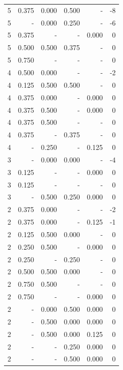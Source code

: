 \documentclass[a4paper]{article}\usepackage[]{graphicx}\usepackage[]{color}
\begin{document}
\begin{table}[ht]
\begin{tabular}{rrrrrr}
   \rowcolor{badColor} 5 & 0.375 & 0.000 & 0.500 & - & -8 \\ 
   \rowcolor{badColor} 5 & - & 0.000 & 0.250 & - & -6 \\ 
   \rowcolor{nullColor} 5 & 0.375 & - & - & 0.000 & 0 \\ 
  5 & 0.500 & 0.500 & 0.375 & - & 0 \\ 
   \rowcolor{nullColor} 5 & 0.750 & - & - & - & 0 \\ 
  4 & 0.500 & 0.000 & - & - & -2 \\ 
   \rowcolor{goodColor} 4 & 0.125 & 0.500 & 0.500 & - & 0 \\ 
  4 & 0.375 & 0.000 & - & 0.000 & 0 \\ 
  4 & 0.375 & 0.500 & - & 0.000 & 0 \\ 
  4 & 0.375 & 0.500 & - & - & 0 \\ 
   \rowcolor{sosoColor} 4 & 0.375 & - & 0.375 & - & 0 \\ 
  4 & - & 0.250 & - & 0.125 & 0 \\ 
   \rowcolor{goodColor} 3 & - & 0.000 & 0.000 & - & -4 \\ 
   \rowcolor{nullColor} 3 & 0.125 & - & - & 0.000 & 0 \\ 
   \rowcolor{nullColor} 3 & 0.125 & - & - & - & 0 \\ 
   \rowcolor{badColor} 3 & - & 0.500 & 0.250 & 0.000 & 0 \\ 
  2 & 0.375 & 0.000 & - & - & -2 \\ 
  2 & 0.375 & 0.000 & - & 0.125 & -1 \\ 
   \rowcolor{badColor} 2 & 0.125 & 0.500 & 0.000 & - & 0 \\ 
  2 & 0.250 & 0.500 & - & 0.000 & 0 \\ 
   \rowcolor{sosoColor} 2 & 0.250 & - & 0.250 & - & 0 \\ 
   \rowcolor{badColor} 2 & 0.500 & 0.500 & 0.000 & - & 0 \\ 
  2 & 0.750 & 0.500 & - & - & 0 \\ 
   \rowcolor{nullColor} 2 & 0.750 & - & - & 0.000 & 0 \\ 
   \rowcolor{badColor} 2 & - & 0.000 & 0.500 & 0.000 & 0 \\ 
   \rowcolor{badColor} 2 & - & 0.500 & 0.000 & 0.000 & 0 \\ 
   \rowcolor{badColor} 2 & - & 0.500 & 0.000 & 0.125 & 0 \\ 
   \rowcolor{sosoColor} 2 & - & - & 0.250 & 0.000 & 0 \\ 
   \rowcolor{sosoColor} 2 & - & - & 0.500 & 0.000 & 0 \\ 

\end{tabular}
\end{table}
\end{document}
